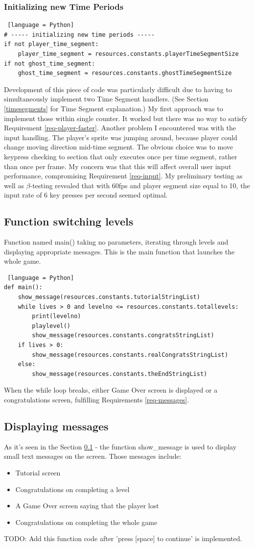 \documentclass[11pt,a4paper]{report}
\newcommand{\dsubsection}[1]{\FloatBarrier \subsection{#1}}
\begin{document}
				\subsubsection{Initializing new Time Periods}
					\begin{lstlisting} [language = Python]
# ----- initializing new time periods -----
if not player_time_segment:
	player_time_segment = resources.constants.playerTimeSegmentSize
if not ghost_time_segment:
	ghost_time_segment = resources.constants.ghostTimeSegmentSize
					\end{lstlisting}
				Development of this piece of code was particularly difficult due to having to simultaneously implement two Time Segment handlers. (See Section \ref{timesegments} for Time Segment explanation.)
				My first approach was to implement those within single counter. It worked but there was no way to satisfy Requirement \ref{req-player-faster}.
				Another problem I encountered was with the input handling. The player's sprite was jumping around, because player could change moving direction mid-time segment. The obvious choice was to move keypress checking to section that only executes once per time segment, rather than once per frame. My concern was that this will affect overall user input performance, compromising Requirement \ref{req-input}. My preliminary testing as well as $\beta$-testing revealed that with 60fps and player segment size equal to 10, the input rate of 6 key presses per second seemed optimal.
			\dsubsection{Function switching levels}
				\label{main}
				Function named main() taking no parameters, iterating through levels and displaying appropriate messages. This is the main function that launches the whole game. 
				\begin{lstlisting} [language = Python]
def main():
	show_message(resources.constants.tutorialStringList)
	while lives > 0 and levelno <= resources.constants.totallevels:
		print(levelno)
		playlevel()
		show_message(resources.constants.congratsStringList)
	if lives > 0:
		show_message(resources.constants.realCongratsStringList)
	else:
		show_message(resources.constants.theEndStringList)
				\end{lstlisting}
				When the while loop breaks, either Game Over screen is displayed or a congratulations screen, fulfilling Requirements \ref{req-messages}.
			\dsubsection{Displaying messages}
				As it's seen in the Section \ref{main} - the function show\_message is used to display small text messages on the screen. Those messages include:
				\begin{itemize}
					\item
						Tutorial screen
					\item
						Congratulations on completing a level
					\item
						A Game Over screen saying that the player lost
					\item
						Congratulations on completing the whole game
				\end{itemize}
				TODO: Add this function code after 'press [space] to continue' is implemented.
\end{document}
